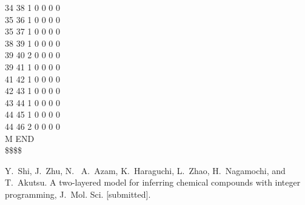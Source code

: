 \documentclass[11pt,titlepage,dvipdfmx,twoside]{article}
\begin{document}
\begin{oframed}
{ 34 38  1  0  0  0  0                                                      \\
 35 36  1  0  0  0  0                                                      \\
 35 37  1  0  0  0  0                                                      \\
 38 39  1  0  0  0  0                                                      \\
 39 40  2  0  0  0  0                                                      \\
 39 41  1  0  0  0  0                                                      \\
 41 42  1  0  0  0  0                                                      \\
 42 43  1  0  0  0  0                                                      \\
 43 44  1  0  0  0  0                                                      \\
 44 45  1  0  0  0  0                                                      \\
 44 46  2  0  0  0  0                                                      \\
M  END                                                                     \\
\$\$\$\$                                                                                                                                          \\ }
\end{oframed}
\begin{thebibliography}{10}
	  Y.~Shi, J.~Zhu, N.~ A.~Azam, K.~Haraguchi, 
	  L.~Zhao, H.~Nagamochi, and T.~Akutsu. 
	  A two-layered model for inferring chemical
compounds with integer programming, 
	  J.~Mol. Sci. [submitted]. 
\end{thebibliography}
\end{document}
